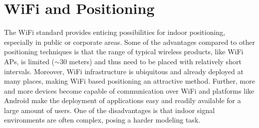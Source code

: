 \documentclass{LTHthesis}
\begin{document}
\section{WiFi and Positioning}
\label{sec:wifi_positioning}
%
The WiFi standard provides enticing possibilities for indoor positioning, especially in public or corporate areas. Some of the advantages compared to other positioning techniques is that the range of typical wireless products, like WiFi APs, is limited ($\sim 30$ meters) and thus need to be placed with relatively short intervals. Moreover, WiFi infrastructure is ubiquitous and already deployed at many places, making WiFi based positioning an attractive method. Further, more and more devices become capable of communication over WiFi and platforms like Android make the deployment of applications easy and readily available for a large amount of users. One of the disadvantages is that indoor signal environments are often complex, posing a harder modeling task.
\end{document}
